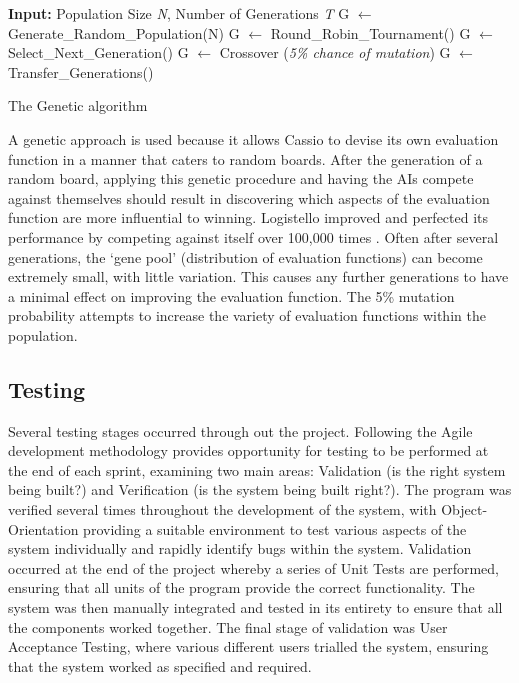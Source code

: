 \documentclass[12pt,a4paper]{article}
\begin{document}
\begin{algorithm}[H]
\begin{algorithmic}[1]

\STATE \textbf{Input:} Population Size \textit{N}, Number of Generations \textit{T}
\STATE G $\leftarrow$ Generate\_Random\_Population(N)
	\STATE G $\leftarrow$ Round\_Robin\_Tournament()
	\STATE G $\leftarrow$ Select\_Next\_Generation()
	\STATE G $\leftarrow$ Crossover (\textit{5\% chance of mutation})
	\STATE G $\leftarrow$ Transfer\_Generations()
\ENDFOR
\end{algorithmic}
\caption{The Genetic algorithm}
\label{alg:genetic}
\end{algorithm}

A genetic approach is used because it allows Cassio to devise its own evaluation function in a manner that caters to random boards. After the generation of a random board, applying this genetic procedure and having the AIs compete against themselves should result in discovering which aspects of the evaluation function are more influential to winning. Logistello improved and perfected its performance by competing against itself over 100,000 times \cite{buro1997evaluation}. Often after several generations, the `gene pool' (distribution of evaluation functions) can become extremely small, with little variation. This causes any further generations to have a minimal effect on improving the evaluation function. The 5\% mutation probability attempts to increase the variety of evaluation functions within the population.

\subsection*{Testing}

Several testing stages occurred through out the project. Following the Agile development methodology provides opportunity for testing to be performed at the end of each sprint, examining two main areas: Validation (is the right system being built?) and Verification (is the system being built right?). The program was verified several times throughout the development of the system, with Object-Orientation providing a suitable environment to test various aspects of the system individually and rapidly identify bugs within the system. 
Validation occurred at the end of the project whereby a series of Unit Tests are performed, ensuring that all units of the program provide the correct functionality. The system was then manually integrated and tested in its entirety to ensure that all the components worked together. The final stage of validation was User Acceptance Testing, where various different users trialled the system, ensuring that the system worked as specified and required.
\end{document}
